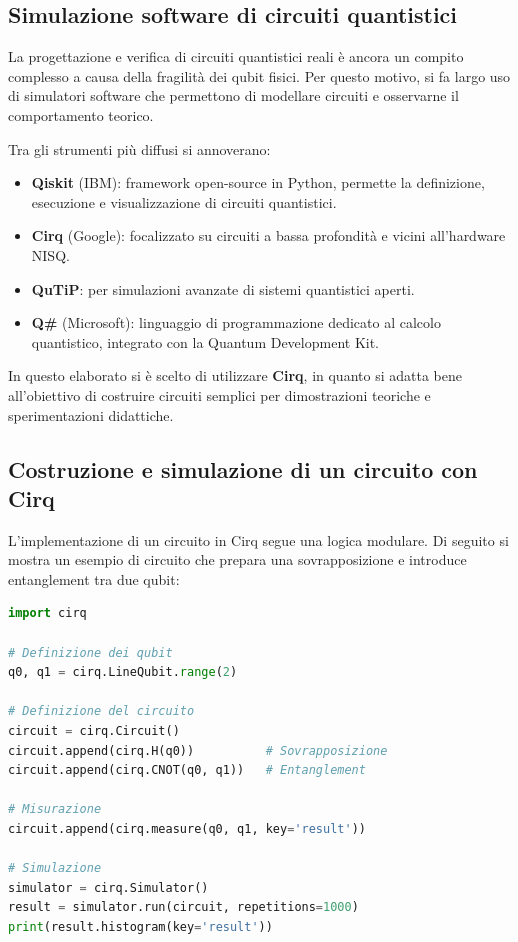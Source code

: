 \documentclass[a4paper,12pt]{report}
\theoremstyle{plain}
\begin{document}
\subsection{Simulazione software di circuiti quantistici}

La progettazione e verifica di circuiti quantistici reali è ancora un compito complesso a causa della fragilità dei qubit fisici. Per questo motivo, si fa largo uso di simulatori software che permettono di modellare circuiti e osservarne il comportamento teorico.

Tra gli strumenti più diffusi si annoverano:

\begin{itemize}
  \item \textbf{Qiskit} (IBM): framework open-source in Python, permette la definizione, esecuzione e visualizzazione di circuiti quantistici.
  \item \textbf{Cirq} (Google): focalizzato su circuiti a bassa profondità e vicini all'hardware NISQ.
  \item \textbf{QuTiP}: per simulazioni avanzate di sistemi quantistici aperti.
  \item \textbf{Q\#} (Microsoft): linguaggio di programmazione dedicato al calcolo quantistico, integrato con la Quantum Development Kit.
\end{itemize}

In questo elaborato si è scelto di utilizzare \textbf{Cirq}, in quanto si adatta bene all'obiettivo di costruire circuiti semplici per dimostrazioni teoriche e sperimentazioni didattiche.

\subsection{Costruzione e simulazione di un circuito con Cirq}

L'implementazione di un circuito in Cirq segue una logica modulare. Di seguito si mostra un esempio di circuito che prepara una sovrapposizione e introduce entanglement tra due qubit:

\begin{lstlisting}[language=Python, caption={Costruzione di un circuito in Cirq}]
import cirq

# Definizione dei qubit
q0, q1 = cirq.LineQubit.range(2)

# Definizione del circuito
circuit = cirq.Circuit()
circuit.append(cirq.H(q0))          # Sovrapposizione
circuit.append(cirq.CNOT(q0, q1))   # Entanglement

# Misurazione
circuit.append(cirq.measure(q0, q1, key='result'))

# Simulazione
simulator = cirq.Simulator()
result = simulator.run(circuit, repetitions=1000)
print(result.histogram(key='result'))
\end{lstlisting}
\end{document}

